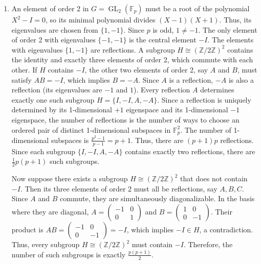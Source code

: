\documentclass{article}
\begin{document}
\begin{enumerate}[label=\fbox{\arabic*}]
  \item %
        An element of order 2 in $G = \operatorname{GL}_2(\mathbb{F}_p)$ must be a root of the polynomial $X^2 - I = 0$, so its minimal polynomial divides $(X-1)(X+1)$. Thus, its eigenvalues are chosen from $\{1, -1\}$. 
        Since $p$ is odd, $1 \neq -1$. The only element of order 2 with eigenvalues $\{-1, -1\}$ is the central element $-I$. The elements with eigenvalues $\{1, -1\}$ are reflections. 
        A subgroup $H \cong (\mathbb{Z}/2\mathbb{Z})^2$ contains the identity and exactly three elements of order 2, which commute with each other. 
        If $H$ contains $-I$, the other two elements of order 2, say $A$ and $B$, must satisfy $AB = -I$, which implies $B = -A$. Since $A$ is a reflection, $-A$ is also a reflection (its eigenvalues are $-1$ and $1$). Every reflection $A$ determines exactly one such subgroup $H = \{I, -I, A, -A\}$.
        Since a reflection is uniquely determined by its 1-dimensional $+1$ eigenspace and its 1-dimensional $-1$ eigenspace, the number of reflections is the number of ways to choose an ordered pair of distinct 1-dimensional subspaces in $\mathbb{F}_p^2$. The number of 1-dimensional subspaces is $\frac{p^2-1}{p-1} = p+1$. Thus, there are $(p+1)p$ reflections. 
        Since each subgroup $\{I, -I, A, -A\}$ contains exactly two reflections, there are $\frac{1}{2} p(p+1)$ such subgroups.
        
        Now suppose there exists a subgroup $H \cong (\mathbb{Z}/2\mathbb{Z})^2$ that does not contain $-I$. Then its three elements of order 2 must all be reflections, say $A, B, C$. Since $A$ and $B$ commute, they are simultaneously diagonalizable. In the basis where they are diagonal, $A = \begin{pmatrix} -1 & 0 \\ 0 & 1 \end{pmatrix}$ and $B = \begin{pmatrix} 1 & 0 \\ 0 & -1 \end{pmatrix}$. Their product is $AB = \begin{pmatrix} -1 & 0 \\ 0 & -1 \end{pmatrix} = -I$, which implies $-I \in H$, a contradiction.
        Thus, every subgroup $H \cong (\mathbb{Z}/2\mathbb{Z})^2$ must contain $-I$. 
        Therefore, the number of such subgroups is exactly $\frac{p(p+1)}{2}$.


\end{enumerate}
\end{document}
